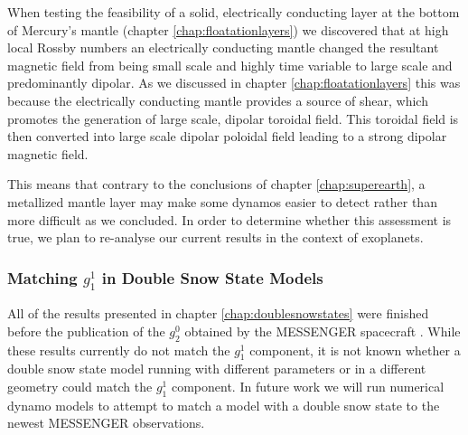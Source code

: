 When testing the feasibility of a solid, electrically conducting layer at the bottom of Mercury's mantle (chapter \ref{chap:floatationlayers}) we discovered that at high local Rossby numbers an electrically conducting mantle changed the resultant magnetic field from being small scale and highly time variable to large scale and predominantly dipolar. As we discussed in chapter \ref{chap:floatationlayers} this was because the electrically conducting mantle provides a source of shear, which promotes the generation of large scale, dipolar toroidal field. This toroidal field is then converted into large scale dipolar poloidal field leading to a strong dipolar magnetic field. 

This means that contrary to the conclusions of chapter \ref{chap:superearth}, a metallized mantle layer may make some dynamos easier to detect rather than more difficult as we concluded. In order to determine whether this assessment is true, we plan to re-analyse our current results in the context of exoplanets.

\subsubsection{Matching $g_1^1$ in Double Snow State Models}
All of the results presented in chapter \ref{chap:doublesnowstates} were finished before the publication of the $g_2^0$ obtained by the MESSENGER spacecraft \citep{anderson2012}. While these results currently do not match the $g_1^1$ component, it is not known whether a double snow state model running with different parameters or in a different geometry could match the $g_1^1$ component. In future work we will run numerical dynamo models to attempt to match a model with a double snow state to the newest MESSENGER observations.